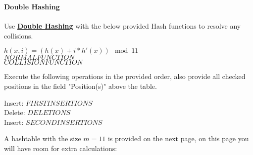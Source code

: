\textbf{\LARGE{\color{tumgadPurple} Double Hashing}}\\
\\
\noindent
Use \href{https://sebastianoner.github.io/TUMGAD/src/Algorithms/Hashing/Double/DoubleHashing}{\textbf{\underline{Double Hashing}}} with
the below provided Hash functions to resolve any collisions.
\begin{center}
    $h(x,i) = (h(x) + i* h'(x)) \mod 11$\\
    $NORMALFUNCTION$\\
    $COLLISIONFUNCTION$\\
\end{center}
Execute the following operations in the provided order, also provide all checked positions in the field "Position(s)" above the table.\\
\begin{center}
    Insert: $FIRSTINSERTIONS$\\
    Delete: $DELETIONS$\\
    Insert: $SECONDINSERTIONS$\\
\end{center}
A hashtable with the size $m = 11$ is provided on the next page, on this page you will have room for extra calculations:\\
\newline
\noindent\fbox{
    \parbox{\textwidth}{
        \vspace{12cm}
        \hspace{11cm}
    }
}
\newpage
